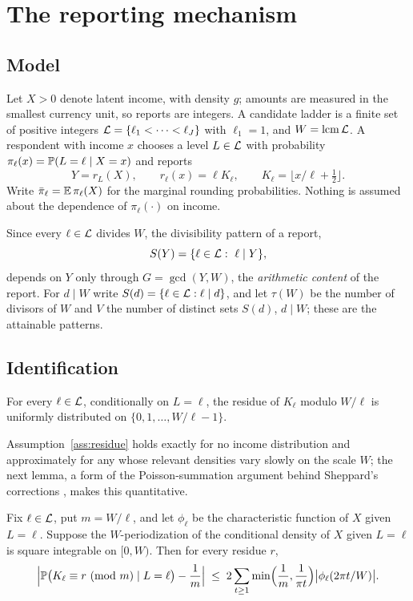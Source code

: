 \section{The reporting mechanism}\label{sec:mechanism}

\subsection{Model}

Let $X>0$ denote latent income, with density $g$; amounts are measured in the smallest currency unit, so reports are integers. A candidate ladder is a finite set of positive integers $\mathcal{L}=\{\ell_1<\cdots<\ell_J\}$ with $\ell_1=1$, and $W=\operatorname{lcm}\mathcal{L}$. A respondent with income $x$ chooses a level $L\in\mathcal{L}$ with probability $\pi_\ell(x)=\mathbb{P}(L=\ell\mid X=x)$ and reports
\[
Y=r_L(X),\qquad r_\ell(x)=\ell K_\ell,\qquad K_\ell=\lfloor x/\ell+\tfrac12\rfloor .
\]
Write $\bar\pi_\ell=\mathbb{E}\,\pi_\ell(X)$ for the marginal rounding probabilities. Nothing is assumed about the dependence of $\pi_\ell(\cdot)$ on income.

Since every $\ell\in\mathcal{L}$ divides $W$, the divisibility pattern of a report,
\[
S(Y)=\{\ell\in\mathcal{L}:\ \ell\mid Y\},
\]
depends on $Y$ only through $G=\gcd(Y,W)$, the \emph{arithmetic content} of the report. For $d\mid W$ write $S(d)=\{\ell\in\mathcal{L}:\ell\mid d\}$, and let $\tau(W)$ be the number of divisors of $W$ and $V$ the number of distinct sets $S(d)$, $d\mid W$; these are the attainable patterns.

\subsection{Identification}

\begin{assumption}\label{ass:residue}
For every $\ell\in\mathcal{L}$, conditionally on $L=\ell$, the residue of $K_\ell$ modulo $W/\ell$ is uniformly distributed on $\{0,1,\dots,W/\ell-1\}$.
\end{assumption}

Assumption~\ref{ass:residue} holds exactly for no income distribution and approximately for any whose relevant densities vary slowly on the scale $W$; the next lemma, a form of the Poisson-summation argument behind Sheppard's corrections \citep[see][]{Janson2006}, makes this quantitative.

\begin{lemma}\label{lem:fourier}
Fix $\ell\in\mathcal{L}$, put $m=W/\ell$, and let $\phi_\ell$ be the characteristic function of $X$ given $L=\ell$. Suppose the $W$-periodization of the conditional density of $X$ given $L=\ell$ is square integrable on $[0,W)$. Then for every residue $r$,
\[
\Bigl|\Prob\bigl(K_\ell\equiv r \ (\mathrm{mod}\ m)\mid L=\ell\bigr)-\frac1m\Bigr|
\;\le\; 2\sum_{t\ge1}\min\Bigl(\frac1m,\frac1{\pi t}\Bigr)\bigl|\phi_\ell(2\pi t/W)\bigr| .
\]
\end{lemma}

